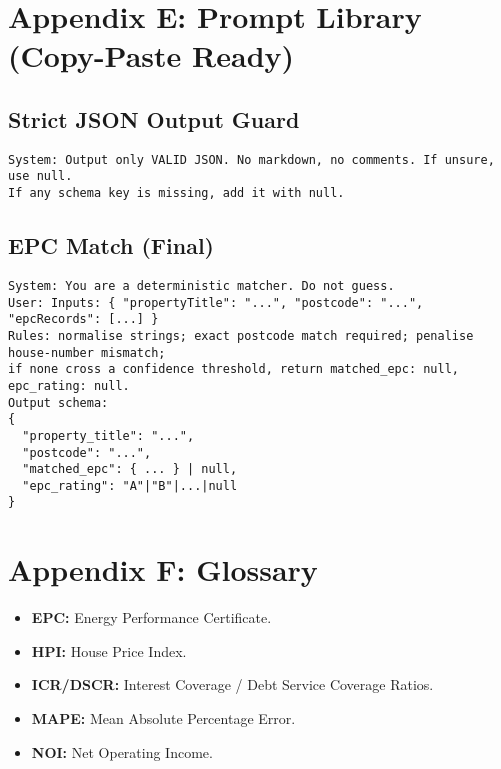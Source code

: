 \documentclass[12pt,a4paper]{article}
\begin{document}
\section*{Appendix E: Prompt Library (Copy-Paste Ready)}
\subsection*{Strict JSON Output Guard}
\begin{lstlisting}
System: Output only VALID JSON. No markdown, no comments. If unsure, use null.
If any schema key is missing, add it with null.
\end{lstlisting}

\subsection*{EPC Match (Final)}
\begin{lstlisting}
System: You are a deterministic matcher. Do not guess.
User: Inputs: { "propertyTitle": "...", "postcode": "...", "epcRecords": [...] }
Rules: normalise strings; exact postcode match required; penalise house-number mismatch;
if none cross a confidence threshold, return matched_epc: null, epc_rating: null.
Output schema:
{
  "property_title": "...",
  "postcode": "...",
  "matched_epc": { ... } | null,
  "epc_rating": "A"|"B"|...|null
}
\end{lstlisting}

\section*{Appendix F: Glossary}
\begin{itemize}[leftmargin=1.5em]
  \item \textbf{EPC:} Energy Performance Certificate.
  \item \textbf{HPI:} House Price Index.
  \item \textbf{ICR/DSCR:} Interest Coverage / Debt Service Coverage Ratios.
  \item \textbf{MAPE:} Mean Absolute Percentage Error.
  \item \textbf{NOI:} Net Operating Income.
\end{itemize}
\end{document}
